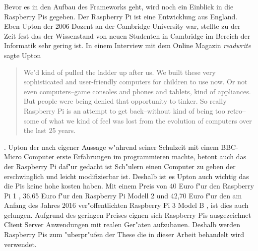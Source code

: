 Bevor es in den Aufbau des Frameworks geht, wird noch ein Einblick in die Raspberry Pis gegeben. %
Der Raspberry Pi ist eine Entwicklung aus England. Eben Upton der 2006 Dozent an der Cambridge University %
war, stellte zu der Zeit fest das der Wissenstand von neuen Studenten in Cambridge im Bereich der Informatik %
sehr gering ist. In einem Interview mit dem Online Magazin \emph{readwrite} sagte Upton \begin{quotation}We'd kind of pulled the ladder %
up after us. We built these very sophisticated and user-friendly computers for children to use now. Or not %
even computers--game consoles and phones and tablets, kind of appliances. But people were being denied that %
opportunity to tinker. So really Raspberry Pi is an attempt to get back--without kind of being too retro--some %
of what we kind of feel was lost from the evolution of computers over the last 25 years.\end{quotation}\autocite{web:readWrite}. %
Upton der nach eigener Aussage w"ahrend seiner Schulzeit mit einem BBC-Micro Computer erste Erfahrungen im programmieren %
machte, betont auch das der Raspberry Pi daf"ur gedacht ist Sch"ulern einen Computer zu geben der erschwinglich und leicht modifizierbar ist. %
Deshalb ist es Upton auch wichtig das die Pis keine hohe kosten haben. Mit einem Preis von 40 Euro f"ur den Raspberry Pi 1 %
\autocite{amazon:pi1}, 36,65 Euro f"ur den Raspberry Pi Modell 2 \autocite{amazon:pi2} und 42,70 Euro f"ur den %
am Anfang des Jahres 2016 ver"offentlichten Raspberry Pi 3 Model B \autocite{amazon:pi3}, ist dies auch gelungen. %
Aufgrund des geringen Preises eignen sich Raspberry Pis ausgezeichnet Client Server Anwendungen mit realen Ger"aten %
aufzubauen. Deshalb werden Raspberry Pis zum "uberpr"ufen der These die in dieser Arbeit behandelt wird verwendet. %

